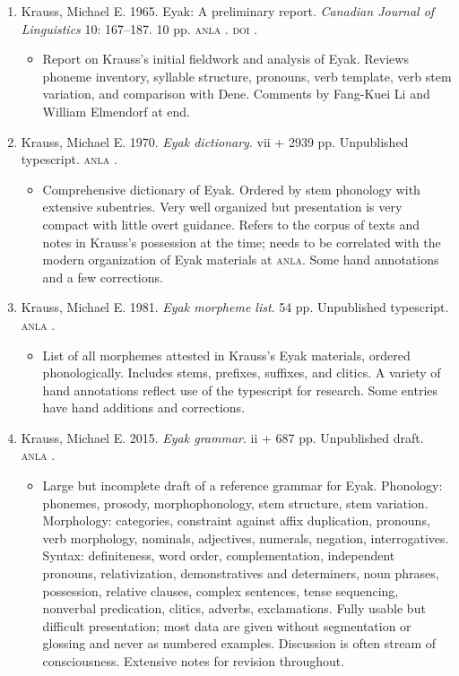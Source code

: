 \documentclass[12pt,letterpaper,oneside,article]{memoir}
\begin{document}
\begin{enumerate}
\item	Krauss, Michael E.
	1965.
	Eyak: A preliminary report.
	\textit{Canadian Journal of Linguistics} 10: 167–187.
	10 pp.
	\textsc{anla} .
	\textsc{doi} .
	\begin{itemize}
	\item	Report on Krauss’s initial fieldwork and analysis of Eyak.
		Reviews phoneme inventory, syllable structure, pronouns,
		verb template, verb stem variation, and comparison with Dene.
		Comments by Fang-Kuei Li and William Elmendorf at end.
	\end{itemize}
\item	Krauss, Michael E.
	1970.
	\textit{Eyak dictionary}.
	vii + 2939 pp.
	Unpublished typescript.
	\textsc{anla} .
	\begin{itemize}
	\item	Comprehensive dictionary of Eyak.
		Ordered by stem phonology with extensive subentries.
		Very well organized but presentation is very compact with little
		overt guidance.
		Refers to the corpus of texts and notes in Krauss’s possession at the time;
		needs to be correlated with the modern organization of Eyak materials at
		\textsc{anla}.
		Some hand annotations and a few corrections.
	\end{itemize}
\item	Krauss, Michael E.
	1981.
	\textit{Eyak morpheme list}.
	54 pp.
	Unpublished typescript.
	\textsc{anla} .
	\begin{itemize}
	\item	List of all morphemes attested in Krauss’s Eyak materials, ordered
		phonologically.
		Includes stems, prefixes, suffixes, and clitics.
		A variety of hand annotations reflect use of the typescript for research.
		Some entries have hand additions and corrections.
	\end{itemize}
\item	Krauss, Michael E.
	2015.
	\textit{Eyak grammar}.
	ii + 687 pp.
	Unpublished draft.
	\textsc{anla} .
	\begin{itemize}
	\item	Large but incomplete draft of a reference grammar for Eyak.
		Phonology: phonemes, prosody, morphophonology, stem structure,
		stem variation.
		Morphology: categories, constraint against affix duplication, pronouns,
		verb morphology, nominals, adjectives, numerals, negation, interrogatives.
		Syntax: definiteness, word order, complementation, independent pronouns,
		relativization, demonstratives and determiners, noun phrases, possession,
		relative clauses, complex sentences, tense sequencing, nonverbal predication,
		clitics, adverbs, exclamations.
		Fully usable but difficult presentation; most data are given without
		segmentation or glossing and never as numbered examples.
		Discussion is often stream of consciousness.
		Extensive notes for revision throughout.
	\end{itemize}
\end{enumerate}
\end{document}
